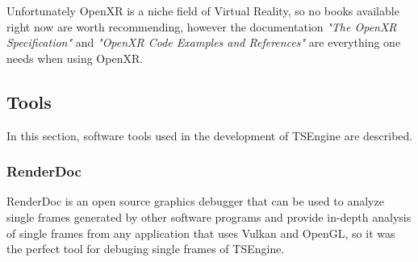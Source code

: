 Unfortunately OpenXR is a niche field of Virtual Reality, so no books available right now are worth recommending, however the documentation \textit{"The OpenXR Specification"} \cite{XrDoc} and \textit{"OpenXR Code Examples and References"} \cite{OpenXrExamples} are everything one needs when using OpenXR.

\subsection{Tools}
\hspace{\parindent}
In this section, software tools used in the development of TSEngine are described.
\subsubsection{RenderDoc}
\hspace{\parindent}
\label{sec:renderdoc}
RenderDoc is an open source graphics debugger that can be used to analyze single frames generated by other software programs and provide in-depth analysis of single frames from any application that uses Vulkan and OpenGL, so it was the perfect tool for debuging single frames of TSEngine.